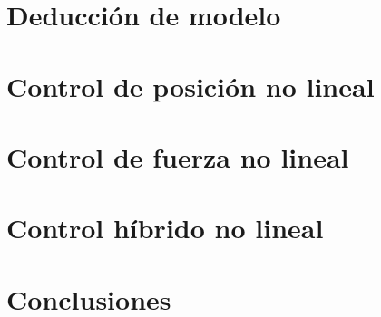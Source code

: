 



\def\verObs{1}


\setmainfont{AvenirLTStd-Roman}



\setmainfont{Calibri}


\tableofcontents
\newpage


\section{Deducción de modelo}


\section{Control de posición no lineal}
\label{sec:posic}


\section{Control de fuerza no lineal}
\label{sec:fuerza}


\section{Control híbrido no lineal}


\section{Conclusiones}


%

